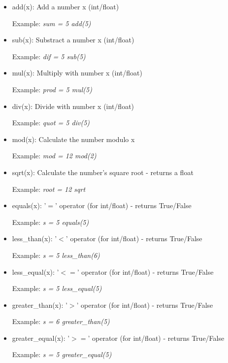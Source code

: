 \documentclass{article}
\begin{document}
\begin{itemize}
\item add(x): Add a number x (int/float)

Example: \textit{sum = 5 add(5)}

\item sub(x): Substract a number x (int/float)

Example: \textit{dif = 5 sub(5)}

\item mul(x): Multiply with number x (int/float)

Example: \textit{prod = 5 mul(5)}

\item div(x): Divide with number x (int/float)

Example: \textit{quot = 5 div(5)}

\item mod(x): Calculate the number modulo x

Example: \textit{mod = 12 mod(2)}

\item sqrt(x): Calculate the number's square root - returns a float

Example: \textit{root = 12 sqrt}

\item equals(x): '$=$' operator (for int/float) - returns True/False

Example: \textit{s = 5 equals(5)}

\item less\_than(x): '$<$' operator (for int/float) - returns True/False

Example: \textit{s = 5 less\_than(6)}

\item less\_equal(x): '$<=$' operator (for int/float) - returns True/False

Example: \textit{s = 5 less\_equal(5)}

\item greater\_than(x): '$>$' operator (for int/float) - returns True/False

Example: \textit{s = 6 greater\_than(5)}

\item greater\_equal(x): '$>=$' operator (for int/float) - returns True/False

Example: \textit{s = 5 greater\_equal(5)}
\end{itemize}
\end{document}

